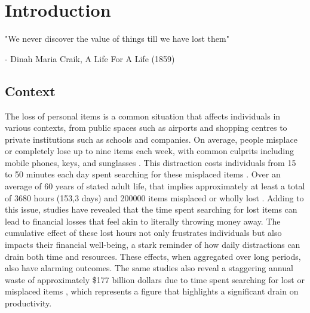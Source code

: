 \chapter{Introduction}
\label{chapter:introduction}

\begin{introduction}
"We never discover the value of things till we have lost them"

- Dinah Maria Craik, A Life For A Life (1859)
\end{introduction}


\section{Context}

The loss of personal items is a common situation that affects individuals in various contexts, from public spaces such as airports and shopping centres to private institutions such as schools and companies.
On average, people misplace or completely lose up to nine items each week, with common culprits including mobile phones, keys, and sunglasses \cite{Prawira2024}.
This distraction costs individuals from 15 to 50 minutes each day spent searching for these misplaced items \cite{Prawira2024, Knierim2012}.
Over an average of 60 years of stated adult life, that implies approximately at least a total of 3680 hours (153,3 days) and 200000 items misplaced or wholly lost \cite{Ahmad2015}.
Adding to this issue, studies have revealed that the time spent searching for lost items can lead to financial losses that feel akin to literally throwing money away.
The cumulative effect of these lost hours not only frustrates individuals but also impacts their financial well-being, a stark reminder of how daily distractions can drain both time and resources.
These effects, when aggregated over long periods, also have alarming outcomes.
The same studies also reveal a staggering annual waste of approximately \$177 billion dollars \cite{Newswire2010} due to time spent searching for lost or misplaced items \cite{Ahmad2015}, which represents a figure that highlights a significant drain on productivity.

